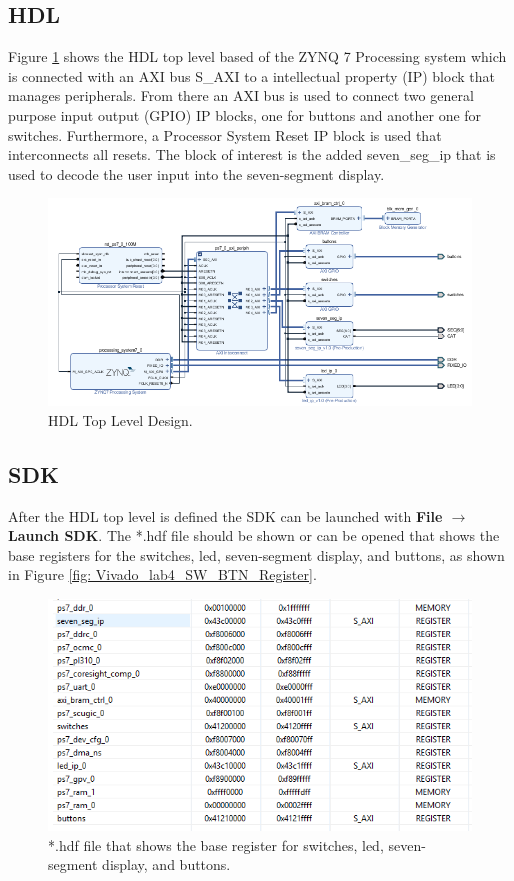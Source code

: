 \subsection{HDL}\label{subsec: HDL}
Figure \ref{fig: Vivado_lab_HDL_topView} shows the HDL top level based of the ZYNQ 7 Processing system which is connected with an AXI bus S\_AXI to a intellectual property (IP) block that manages peripherals. From there an AXI bus is used to connect two general purpose input output (GPIO) IP blocks, one for buttons and another one for switches. Furthermore, a Processor System Reset IP block is used that interconnects all resets. The block of interest is the added seven\_seg\_ip that is used to decode the user input into the seven-segment display.
\begin{figure}[H]
	\centering
	\includegraphics[width=1.0\textwidth]{01_images/Vivado_lab_HDL_topView.PNG}
	\caption{HDL Top Level Design.}
	\label{fig: Vivado_lab_HDL_topView}
\end{figure}

\subsection{SDK}\label{subsec: SDK}
After the HDL top level is defined the SDK can be launched with \textbf{File $\rightarrow$ Launch SDK}. The *.hdf file should be shown or can be opened that shows the base registers for the switches, led, seven-segment display, and buttons, as shown in Figure \ref{fig: Vivado_lab4_SW_BTN_Register}. 
\begin{figure}[H]
	\centering
	\includegraphics[width=1.0\textwidth]{01_images/Vivado_lab4_SW_BTN_Register.PNG}
	\caption{*.hdf file that shows the base register for switches, led, seven-segment display, and buttons.}
	\label{fig: Vivado_lab5_SW_BTN_Register}
\end{figure}

